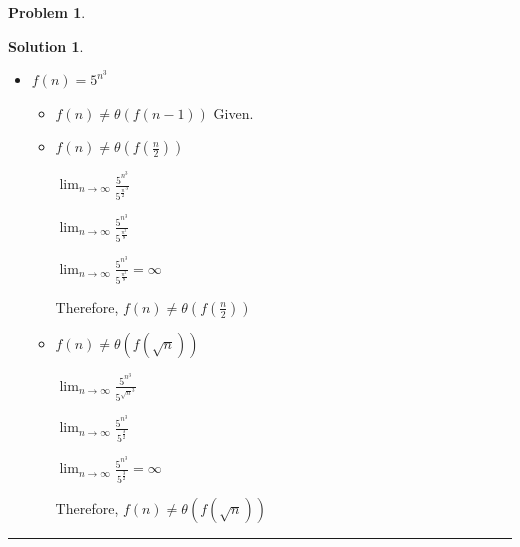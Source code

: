 \documentclass{article}
\theoremstyle{definition}
\newtheorem{problem}{Problem}
\def\fline{\rule{0.75\linewidth}{0.5pt}}
\newcommand{\finishline}{
  \begin{center}\fline
\end{center}}
\newtheorem*{solution*}{Solution}
\newenvironment{solution}{
\begin{solution*}}{{\finishline}
\end{solution*}}
\begin{document}
\begin{problem}
\begin{enumerate}
\begin{solution}
\begin{itemize}
\begin{itemize}
                $\lim_{n \to \infty}\frac{n^{\sqrt{\log n}}}{n^{\sqrt{\log n-1}}} \approx 0$

                Therefore, $f(n) = \theta(f(n-1))$
              \item $f(n) \neq \theta(f(\frac{n}{2})$

                  $\lim_{n \to \infty}\frac{n^{\sqrt{\log n}}}{n^{\sqrt{\log \frac{n}{2}}}}$

                  $\lim_{n \to \infty}\frac{n^{\sqrt{\log n}}}{n^{\sqrt{\log \frac{n}{2}}}} = \infty$

                  Therefore, $f(n) \neq \theta(f(\frac{n}{2}))$
                \item $f(n) \neq \theta(f(\sqrt{n})$

                    $\lim_{n \to \infty}\frac{n^{\sqrt{\log n}}}{n^{\sqrt{\log \sqrt{n}}}}$

                    $\lim_{n \to \infty}\frac{n^{\sqrt{\log n}}}{n^{\sqrt{\log \sqrt{n}}}} = \infty$

                    Therefore, $f(n) \neq \theta(f(\sqrt{n}))$
                \end{itemize}
              \item $f(n) = 5^{n^{3}}$
                \begin{itemize}
                  \item $f(n) \neq \theta(f(n-1))$ Given.
                  \item $f(n) \neq \theta(f(\frac{n}{2}))$

                    $\lim_{n \to \infty}\frac{5^{n^3}}{5^{\frac{n}{2}^3}}$

                    $\lim_{n \to \infty}\frac{5^{n^3}}{5^{\frac{n^3}{8}}}$

                    $\lim_{n \to \infty}\frac{5^{n^3}}{5^{\frac{n^3}{8}}} = \infty$

                    Therefore, $f(n) \neq \theta(f(\frac{n}{2}))$

                  \item $f(n) \neq \theta(f(\sqrt{n}))$

                    $\lim_{n \to \infty}\frac{5^{n^3}}{5^{\sqrt{n}^3}}$

                    $\lim_{n \to \infty}\frac{5^{n^3}}{5^{\frac{3}{2}}}$

                    $\lim_{n \to \infty}\frac{5^{n^3}}{5^{\frac{3}{2}}} = \infty$

                    Therefore, $f(n) \neq \theta(f(\sqrt{n}))$
                \end{itemize}
            \end{itemize}
          \end{solution}


\end{enumerate}
\end{problem}
\end{document}
